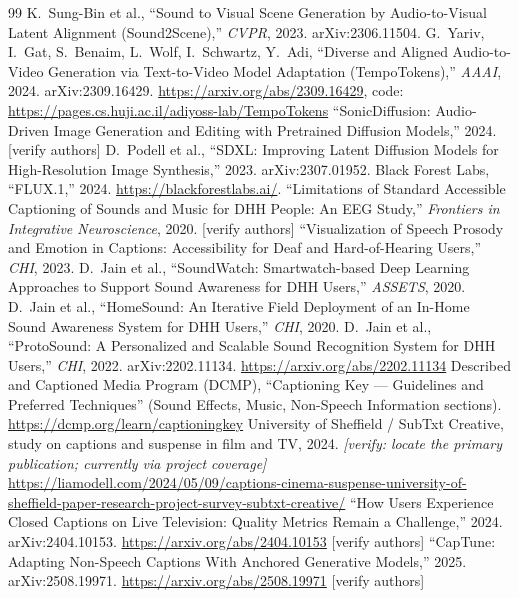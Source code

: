\documentclass[11pt,a4paper]{article}
\begin{document}
\begin{thebibliography}{99}
 K.\ Sung-Bin et al., ``Sound to Visual Scene Generation by Audio-to-Visual Latent Alignment (Sound2Scene),'' \emph{CVPR}, 2023. arXiv:2306.11504.
 G.\ Yariv, I.\ Gat, S.\ Benaim, L.\ Wolf, I.\ Schwartz, Y.\ Adi, ``Diverse and Aligned Audio-to-Video Generation via Text-to-Video Model Adaptation (TempoTokens),'' \emph{AAAI}, 2024. arXiv:2309.16429. \url{https://arxiv.org/abs/2309.16429}, code: \url{https://pages.cs.huji.ac.il/adiyoss-lab/TempoTokens}
 ``SonicDiffusion: Audio-Driven Image Generation and Editing with Pretrained Diffusion Models,'' 2024. [verify authors]
 D.\ Podell et al., ``SDXL: Improving Latent Diffusion Models for High-Resolution Image Synthesis,'' 2023. arXiv:2307.01952.
 Black Forest Labs, ``FLUX.1,'' 2024. \url{https://blackforestlabs.ai/}.
 ``Limitations of Standard Accessible Captioning of Sounds and Music for DHH People: An EEG Study,'' \emph{Frontiers in Integrative Neuroscience}, 2020. [verify authors]
 ``Visualization of Speech Prosody and Emotion in Captions: Accessibility for Deaf and Hard-of-Hearing Users,'' \emph{CHI}, 2023.
 D.\ Jain et al., ``SoundWatch: Smartwatch-based Deep Learning Approaches to Support Sound Awareness for DHH Users,'' \emph{ASSETS}, 2020.
 D.\ Jain et al., ``HomeSound: An Iterative Field Deployment of an In-Home Sound Awareness System for DHH Users,'' \emph{CHI}, 2020.
 D.\ Jain et al., ``ProtoSound: A Personalized and Scalable Sound Recognition System for DHH Users,'' \emph{CHI}, 2022. arXiv:2202.11134. \url{https://arxiv.org/abs/2202.11134}
 Described and Captioned Media Program (DCMP), ``Captioning Key --- Guidelines and Preferred Techniques'' (Sound Effects, Music, Non-Speech Information sections). \url{https://dcmp.org/learn/captioningkey}
 University of Sheffield / SubTxt Creative, study on captions and suspense in film and TV, 2024. \emph{[verify: locate the primary publication; currently via project coverage]} \url{https://liamodell.com/2024/05/09/captions-cinema-suspense-university-of-sheffield-paper-research-project-survey-subtxt-creative/}
 ``How Users Experience Closed Captions on Live Television: Quality Metrics Remain a Challenge,'' 2024. arXiv:2404.10153. \url{https://arxiv.org/abs/2404.10153} [verify authors]
 ``CapTune: Adapting Non-Speech Captions With Anchored Generative Models,'' 2025. arXiv:2508.19971. \url{https://arxiv.org/abs/2508.19971} [verify authors]

\end{thebibliography}
\end{document}
